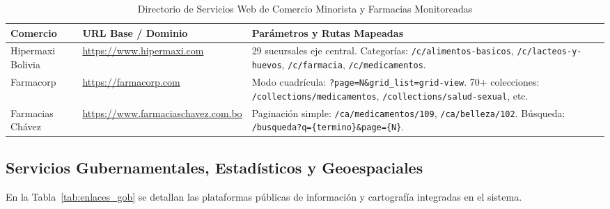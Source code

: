 \begin{table}[htbp]
    \centering
    \small
    \caption{Directorio de Servicios Web de Comercio Minorista y Farmacias Monitoreadas}
    \label{tab:enlaces_retail}
    \begin{tabularx}{\linewidth}{>{\raggedright\arraybackslash}p{3.5cm} >{\raggedright\arraybackslash}p{5.5cm} L}
        \toprule
        \textbf{Comercio} & \textbf{URL Base / Dominio} & \textbf{Parámetros y Rutas Mapeadas} \\
        \midrule
        Hipermaxi Bolivia & \url{https://www.hipermaxi.com} & 29 sucursales eje central. Categorías: \nolinkurl{/c/alimentos-basicos}, \nolinkurl{/c/lacteos-y-huevos}, \nolinkurl{/c/farmacia}, \nolinkurl{/c/medicamentos}. \\
        Farmacorp & \url{https://farmacorp.com} & Modo cuadrícula: \nolinkurl{?page=N&grid_list=grid-view}. 70+ colecciones: \nolinkurl{/collections/medicamentos}, \nolinkurl{/collections/salud-sexual}, etc. \\
        Farmacias Chávez & \url{https://www.farmaciaschavez.com.bo} & Paginación simple: \nolinkurl{/ca/medicamentos/109}, \nolinkurl{/ca/belleza/102}. Búsqueda: \nolinkurl{/busqueda?q={termino}&page={N}}. \\
        \bottomrule
    \end{tabularx}
\end{table}

\subsection{Servicios Gubernamentales, Estadísticos y Geoespaciales}
En la Tabla~\ref{tab:enlaces_gob} se detallan las plataformas públicas de información y cartografía integradas en el sistema.

